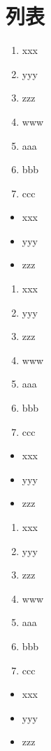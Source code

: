 \section{列表}

\begin{enumerate}
    \item xxx
    \item yyy
    \item zzz
    \item www
    \item aaa
    \item bbb
    \item ccc
\end{enumerate}

\begin{itemize}
    \item xxx
    \item yyy
    \item zzz
\end{itemize}

\begin{enumerate}
    \item xxx
    \item yyy
    \item zzz
    \item www
    \item aaa
    \item bbb
    \item ccc
\end{enumerate}

\begin{itemize}
    \item xxx
    \item yyy
    \item zzz
\end{itemize}

\begin{enumerate}
    \item xxx
    \item yyy
    \item zzz
    \item www
    \item aaa
    \item bbb
    \item ccc
\end{enumerate}

\begin{itemize}
    \item xxx
    \item yyy
    \item zzz
\end{itemize}
